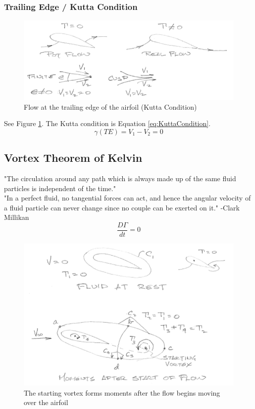\documentclass[draft=false, titlepage]{article}
\begin{document}
\subsubsection{Trailing Edge / Kutta Condition}
\begin{figure}[ht]
    \centering
    \includegraphics[width=0.7\linewidth]{Figures/trailingEdgeCondition.PNG}
    \caption{Flow at the trailing edge of the airfoil (Kutta Condition)}
    \label{fig:TrailingEdgeCondition}
\end{figure}
See Figure \ref{fig:TrailingEdgeCondition}. The Kutta condition is Equation \ref{eq:KuttaCondition}.
\begin{equation}
    \gamma(TE) = V_1-V_2 = 0
    \label{eq:KuttaCondition}
\end{equation}

\subsection{Vortex Theorem of Kelvin}
"The circulation around any path which is always made up of the same fluid particles is independent of the time."\\
"In a perfect fluid, no tangential forces can act, and hence the angular velocity of a fluid particle can never change since no couple can be exerted on it." -Clark Millikan
\begin{equation}
    \frac{D\Gamma}{dt} = 0
    \label{eq:KelvinVortexTheorem}
\end{equation}
\begin{figure}[ht]
    \centering
    \includegraphics[width=0.7\linewidth]{Figures/kelvinVortexTheorem.PNG}
    \caption{The starting vortex forms moments after the flow begins moving over the airfoil}
    \label{fig:StartingVortex}
\end{figure}
\end{document}
